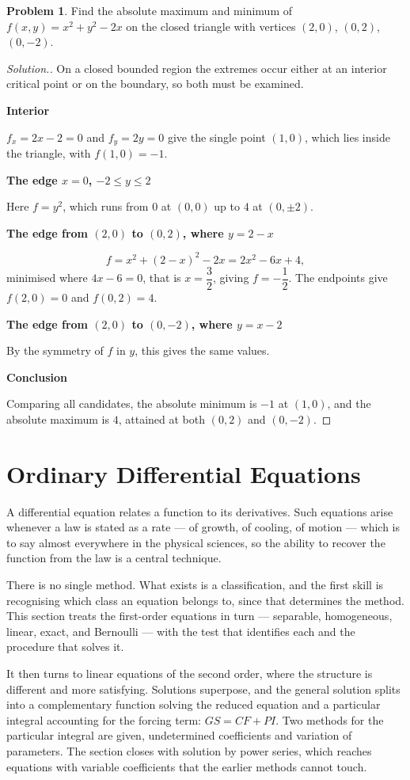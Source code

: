 \documentclass[11pt,a4paper]{article}
\theoremstyle{definition}
\newtheorem{problemx}{Problem}[subsection]
\newenvironment{problem}{\begin{problemx}}{\end{problemx}}
\newenvironment{solution}
  {\renewcommand{\qedsymbol}{}\begin{proof}[\textit{Solution}.]}
  {\end{proof}}
\newcommand{\subhead}[1]{%
  \par\medskip\noindent\textbf{#1}\par\nobreak\smallskip}
\begin{document}
\begin{problem}
Find the absolute maximum and minimum of $f(x,y) = x^2+y^2-2x$ on the closed
triangle with vertices $(2,0)$, $(0,2)$, $(0,-2)$.
\end{problem}
\begin{solution}
On a closed bounded region the extremes occur either at an interior critical
point or on the boundary, so both must be examined.

\subhead{Interior}
$f_x = 2x-2 = 0$ and $f_y = 2y = 0$ give the single point $(1,0)$, which lies
inside the triangle, with $f(1,0) = -1$.

\subhead{The edge $x=0$, $-2\leq y\leq 2$}
Here $f = y^2$, which runs from $0$ at $(0,0)$ up to $4$ at $(0,\pm 2)$.

\subhead{The edge from $(2,0)$ to $(0,2)$, where $y = 2-x$}
$$f = x^2+(2-x)^2-2x = 2x^2-6x+4 ,$$
minimised where $4x-6 = 0$, that is $x = \dfrac32$, giving
$f = -\dfrac12$. The endpoints give $f(2,0) = 0$ and $f(0,2) = 4$.

\subhead{The edge from $(2,0)$ to $(0,-2)$, where $y = x-2$}
By the symmetry of $f$ in $y$, this gives the same values.

\subhead{Conclusion}
Comparing all candidates, the absolute minimum is $-1$ at $(1,0)$, and the
absolute maximum is $4$, attained at both $(0,2)$ and $(0,-2)$.
\end{solution}




\section{Ordinary Differential Equations}

A differential equation relates a function to its derivatives. Such equations
arise whenever a law is stated as a rate --- of growth, of cooling, of motion ---
which is to say almost everywhere in the physical sciences, so the ability to
recover the function from the law is a central technique.

There is no single method. What exists is a classification, and the first skill
is recognising which class an equation belongs to, since that determines the
method. This section treats the first-order equations in turn --- separable,
homogeneous, linear, exact, and Bernoulli --- with the test that identifies each
and the procedure that solves it.

It then turns to linear equations of the second order, where the structure is
different and more satisfying. Solutions superpose, and the general solution
splits into a complementary function solving the reduced equation and a
particular integral accounting for the forcing term: $GS = CF + PI$. Two methods
for the particular integral are given, undetermined coefficients and variation
of parameters. The section closes with solution by power series, which reaches
equations with variable coefficients that the earlier methods cannot touch.
\end{document}
